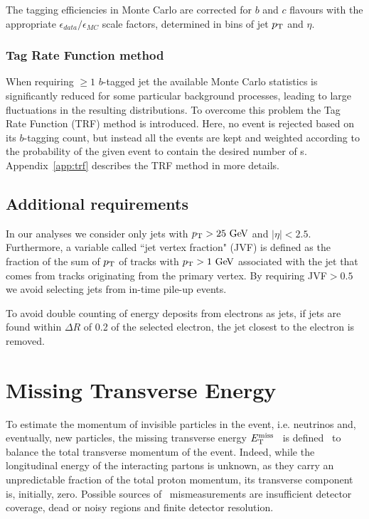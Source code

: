 The tagging efficiencies in Monte Carlo are corrected for $b$ and $c$ flavours
with the appropriate $\epsilon_{data}/\epsilon_{MC}$ scale factors,
determined in bins of jet $\pt$ and $\eta$.

\myskip
\tocless\subsubsection{Tag Rate Function method}\label{sec:trf}
When requiring $\geq 1$ $b$-tagged jet the
available Monte Carlo statistics is significantly reduced for 
some particular background processes, leading to large
fluctuations in the resulting distributions.
To overcome this problem the Tag Rate Function (TRF) method is introduced.
Here, no event is rejected based on its $b$-tagging count, 
but instead all the events are 
kept and weighted according to the
probability of the given event to contain the desired number of \bjet s.
Appendix~\ref{app:trf} describes the TRF method in more details.

\myskip
\tocless\subsection{Additional requirements}
In our analyses we consider only jets with $\pt > 25\gev$ and $|\eta| < 2.5$.
Furthermore, a variable called ``jet vertex fraction" (JVF) is defined as the fraction
of the sum of $\pt$ of tracks with $\pt>1\gev$
associated with the jet that comes from tracks originating from the primary vertex.
By requiring JVF$>0.5$ we avoid selecting jets from in-time pile-up events.

To avoid double counting of energy deposits from electrons as jets,
if jets are found within $\Delta R$ of 0.2 of the selected electron, the
jet closest to the electron is removed. 


\section{Missing Transverse Energy}\label{sec:met}

To estimate the momentum of invisible particles in the event, i.e. neutrinos and, eventually, new particles,
the missing transverse energy $\met$~\cite{met} is defined~\cite{topcommon2013} to balance the total transverse momentum of the event.
Indeed, while the longitudinal energy of the interacting partons is unknown, as they carry an unpredictable
fraction of the total proton momentum, its transverse component is, initially, zero.
Possible sources of \met\ mismeasurements are
insufficient detector coverage, dead or noisy regions and
finite detector resolution.

